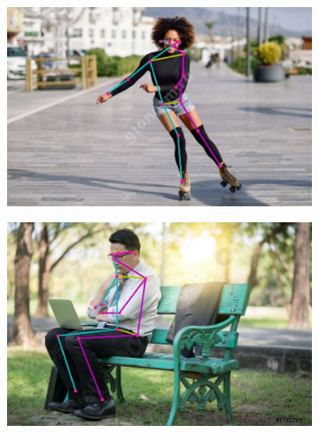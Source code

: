 \begin{figure}[h]
\begin{subfigure}[b]{.5\textwidth}
	\centering
	\includegraphics[width=\textwidth]{./images/MoveNet/19}
	\caption{ }
\end{subfigure}
\begin{subfigure}[b]{.5\textwidth}
	\centering
   \includegraphics[width=\textwidth]{./images/MoveNet/23}
   \caption{ }
\end{subfigure}
\begin{subfigure}[b]{.5\textwidth}
	\centering

\end{subfigure}
\end{figure}

